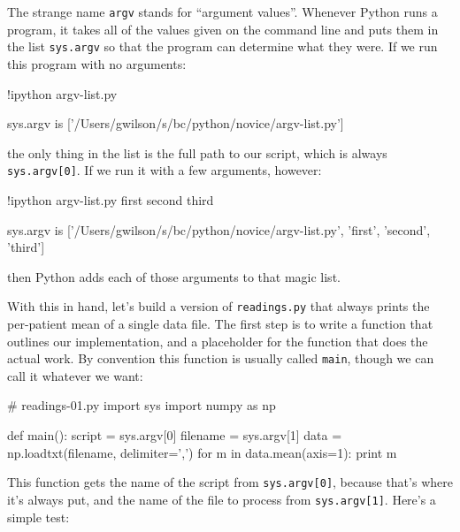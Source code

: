 The strange name \texttt{argv} stands for ``argument values''. Whenever
Python runs a program, it takes all of the values given on the command
line and puts them in the list \texttt{sys.argv} so that the program can
determine what they were. If we run this program with no arguments:

\begin{VerbIn}
!ipython argv-list.py
\end{VerbIn}

\begin{VerbOut}
sys.argv is ['/Users/gwilson/s/bc/python/novice/argv-list.py']
\end{VerbOut}

the only thing in the list is the full path to our script, which is
always \texttt{sys.argv{[}0{]}}. If we run it with a few arguments,
however:

\begin{VerbIn}
!ipython argv-list.py first second third
\end{VerbIn}

\begin{VerbOut}
sys.argv is ['/Users/gwilson/s/bc/python/novice/argv-list.py', 'first', 'second', 'third']
\end{VerbOut}

then Python adds each of those arguments to that magic list.

With this in hand, let's build a version of \texttt{readings.py} that
always prints the per-patient mean of a single data file. The first step
is to write a function that outlines our implementation, and a
placeholder for the function that does the actual work. By convention
this function is usually called \texttt{main}, though we can call it
whatever we want:

\begin{VerbIn}
# readings-01.py
import sys
import numpy as np

def main():
    script = sys.argv[0]
    filename = sys.argv[1]
    data = np.loadtxt(filename, delimiter=',')
    for m in data.mean(axis=1):
        print m
\end{VerbIn}

This function gets the name of the script from \texttt{sys.argv{[}0{]}},
because that's where it's always put, and the name of the file to
process from \texttt{sys.argv{[}1{]}}. Here's a simple test:



